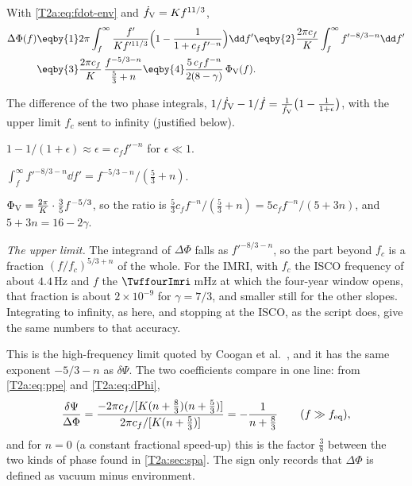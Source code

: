 With \eqref{T2a:eq:fdot-env} and $\dot f_{\rm V}=Kf^{11/3}$,
\begin{align}
  \Delta\Phi(f)
  &\eqby{1}2\pi\int_f^{\infty}\frac{f'}{K f'^{11/3}}\Big(1-\frac1{1+c_ff'^{-n}}\Big)\dd f'
  \eqby{2}\frac{2\pi c_f}{K}\int_f^\infty f'^{-8/3-n}\dd f'\nonumber\\
  &\eqby{3}\frac{2\pi c_f}{K}\,\frac{f^{-5/3-n}}{\frac53+n}
  \eqby{4}\frac{5\,c_f f^{-n}}{2(8-\gamma)}\,\Phi_{\rm V}(f).\label{T2a:eq:dPhi}
\end{align}
\begin{explain}
  \item The difference of the two phase integrals, $1/\dot f_{\rm V}-1/\dot f=\frac1{\dot f_{\rm V}}\big(1-\frac1{1+\epsilon}\big)$, with the upper limit $f_c$ sent to infinity (justified below).
  \item $1-1/(1+\epsilon)\approx\epsilon=c_ff'^{-n}$ for $\epsilon\ll1$.
  \item $\int_f^\infty f'^{-8/3-n}\dd f'=f^{-5/3-n}/(\frac53+n)$.
  \item $\Phi_{\rm V}=\frac{2\pi}{K}\cdot\frac35f^{-5/3}$, so the ratio is $\frac{5}{3}c_ff^{-n}/(\frac53+n)=5c_ff^{-n}/(5+3n)$, and $5+3n=16-2\gamma$.
\end{explain}
\emph{The upper limit.} The integrand of $\Delta\Phi$ falls as $f'^{-8/3-n}$, so the part beyond $f_c$ is a fraction $(f/f_c)^{5/3+n}$ of the whole. For the IMRI, with $f_c$ the ISCO frequency of about $4.4$\,Hz and $f$ the $\TwffourImri$\,mHz at which the four-year window opens, that fraction is about $2\times10^{-9}$ for $\gamma=7/3$, and smaller still for the other slopes. Integrating to infinity, as here, and stopping at the ISCO, as the script does, give the same numbers to that accuracy.

This is the high-frequency limit quoted by Coogan et al.\ \cite[eq.~(16)]{Coogan2022}, and it has the same exponent $-5/3-n$ as $\delta\Psi$. The two coefficients compare in one line: from \eqref{T2a:eq:ppe} and \eqref{T2a:eq:dPhi},
\[
  \frac{\delta\Psi}{\Delta\Phi}
  =\frac{-2\pi c_f/[K(n+\frac83)(n+\frac53)]}{2\pi c_f/[K(n+\frac53)]}
  =-\frac1{n+\frac83}\qquad(f\gg f_{\rm eq}),
\]
and for $n=0$ (a constant fractional speed-up) this is the factor $\tfrac38$ between the two kinds of phase found in \cref{T2a:sec:spa}. The sign only records that $\Delta\Phi$ is defined as vacuum minus environment.

